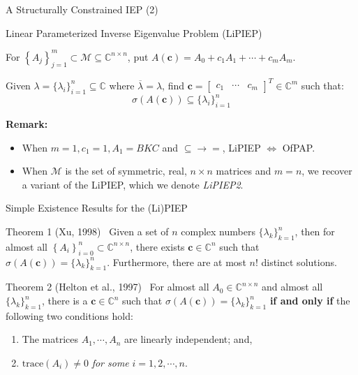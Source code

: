 \documentclass[handout]{beamer}
\begin{document}
\begin{frame}{A Structurally Constrained IEP (2)}

  \begin{titled-frame}{Linear Parameterized Inverse Eigenvalue Problem (LiPIEP)}

    For $\left\{ A_j \right\}_{j=1}^m \subset \mathcal{M} \subseteq \mathbb{C}^{n \times n}$, put $A( \mathbf{c} ) = A_0 + c_1 A_1 + \cdots + c_m A_m$.

    Given $\lambda = \{ \lambda_i \}_{i = 1}^{n} \subseteq \mathbb{C}$ where $\overline{\lambda} = \lambda$, find $\mathbf{c} = \begin{bmatrix} c_1 & \cdots & c_m \end{bmatrix}^T \in \mathbb{C}^{m}$ such that: $$ \sigma(A( \mathbf{c} )) \subseteq \{ \lambda_i \}_{i = 1}^{n} $$

  \end{titled-frame} \pause

  \textbf{Remark:} \pause

  \begin{itemize}
    \item When $m = 1, c_1 = 1, A_1 = B K C$ and $\subseteq \rightarrow =$, LiPIEP $\Leftrightarrow$ OfPAP. \pause
    \item When $\mathcal{M}$ is the set of symmetric, real, $n \times n$ matrices and $m = n$, we recover a variant of the LiPIEP, which we denote \emph{LiPIEP2}.
  \end{itemize}

\end{frame}

\begin{frame}{Simple Existence Results for the (Li)PIEP~\cite{chuInverseEigenvalueProblems2005}}

  \begin{titled-frame}{Theorem 1 (Xu, 1998)~\cite{hsuIntroductionInverseAlgebraic1998}}
    Given a set of $n$ complex numbers $\{ \lambda_k \}_{k = 1}^n$, then for almost all $\left\{ A_i \right\}_{i=0}^n \subset \mathbb{C}^{n \times n}$, there exists $\mathbf{c} \in \mathbb{C}^n$ such that $\sigma( A( \mathbf{c} )) = \{ \lambda_k \}_{k=1}^n$.
    Furthermore, there are at most $n!$ distinct solutions.
  \end{titled-frame} \pause

  \begin{titled-frame}{Theorem 2 (Helton et al., 1997)~\cite{heltonMatrixExtensionsEigenvalueTAMS1997}}
    For almost all $A_0 \in \mathbb{C}^{n \times n}$ and almost all $\{ \lambda_k \}_{k=1}^n$, there is a $\mathbf{c} \in \mathbb{C}^n$ such that $\sigma( A( \mathbf{c} ) ) = \{ \lambda_k \}_{k=1}^n$ \textbf{if and only if} the following two conditions hold:
    \begin{enumerate}
      \item The matrices $A_1, \cdots, A_n$ are linearly independent; and,
      \item $\text{trace}{\left( A_i \right)} \neq 0$ \emph{for some} $i = 1, 2, \cdots, n$.
    \end{enumerate}
  \end{titled-frame}

\end{frame}
\end{document}
